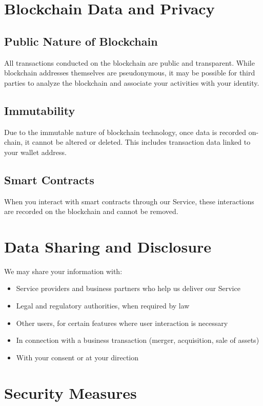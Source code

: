 \documentclass[12pt]{article}
\begin{document}
\section{Blockchain Data and Privacy}

\subsection{Public Nature of Blockchain}
All transactions conducted on the blockchain are public and transparent. While blockchain addresses themselves are pseudonymous, it may be possible for third parties to analyze the blockchain and associate your activities with your identity.

\subsection{Immutability}
Due to the immutable nature of blockchain technology, once data is recorded on-chain, it cannot be altered or deleted. This includes transaction data linked to your wallet address.

\subsection{Smart Contracts}
When you interact with smart contracts through our Service, these interactions are recorded on the blockchain and cannot be removed.

\section{Data Sharing and Disclosure}

We may share your information with:

\begin{itemize}
    \item Service providers and business partners who help us deliver our Service
    \item Legal and regulatory authorities, when required by law
    \item Other users, for certain features where user interaction is necessary
    \item In connection with a business transaction (merger, acquisition, sale of assets)
    \item With your consent or at your direction
\end{itemize}

\section{Security Measures}
\end{document}
